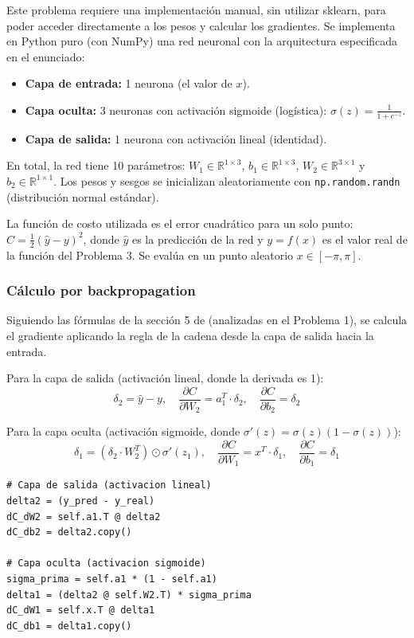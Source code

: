 \documentclass{article}
\begin{document}
Este problema requiere una implementación manual, sin utilizar sklearn, para poder acceder directamente a los pesos y calcular los gradientes. Se implementa en Python puro (con NumPy) una red neuronal con la arquitectura especificada en el enunciado:

\begin{itemize}
    \item \textbf{Capa de entrada:} 1 neurona (el valor de $x$).
    \item \textbf{Capa oculta:} 3 neuronas con activación sigmoide (logística): $\sigma(z) = \frac{1}{1 + e^{-z}}$.
    \item \textbf{Capa de salida:} 1 neurona con activación lineal (identidad).
\end{itemize}

En total, la red tiene 10 parámetros: $W_1 \in \mathbb{R}^{1 \times 3}$, $b_1 \in \mathbb{R}^{1 \times 3}$, $W_2 \in \mathbb{R}^{3 \times 1}$ y $b_2 \in \mathbb{R}^{1 \times 1}$. Los pesos y sesgos se inicializan aleatoriamente con \texttt{np.random.randn} (distribución normal estándar).

La función de costo utilizada es el error cuadrático para un solo punto: $C = \frac{1}{2}(\hat{y} - y)^2$, donde $\hat{y}$ es la predicción de la red y $y = f(x)$ es el valor real de la función del Problema 3. Se evalúa en un punto aleatorio $x \in [-\pi, \pi]$.

\subsubsection{Cálculo por backpropagation}

Siguiendo las fórmulas de la sección 5 de \cite{higham2018deeplearningintroductionapplied} (analizadas en el Problema 1), se calcula el gradiente aplicando la regla de la cadena desde la capa de salida hacia la entrada.

Para la capa de salida (activación lineal, donde la derivada es 1):
\[
    \delta_2 = \hat{y} - y, \quad \frac{\partial C}{\partial W_2} = a_1^T \cdot \delta_2, \quad \frac{\partial C}{\partial b_2} = \delta_2
\]

Para la capa oculta (activación sigmoide, donde $\sigma'(z) = \sigma(z)(1 - \sigma(z))$):
\[
    \delta_1 = (\delta_2 \cdot W_2^T) \odot \sigma'(z_1), \quad \frac{\partial C}{\partial W_1} = x^T \cdot \delta_1, \quad \frac{\partial C}{\partial b_1} = \delta_1
\]

\begin{lstlisting}
# Capa de salida (activacion lineal)
delta2 = (y_pred - y_real)
dC_dW2 = self.a1.T @ delta2
dC_db2 = delta2.copy()

# Capa oculta (activacion sigmoide)
sigma_prima = self.a1 * (1 - self.a1)
delta1 = (delta2 @ self.W2.T) * sigma_prima
dC_dW1 = self.x.T @ delta1
dC_db1 = delta1.copy()
\end{lstlisting}
\end{document}
